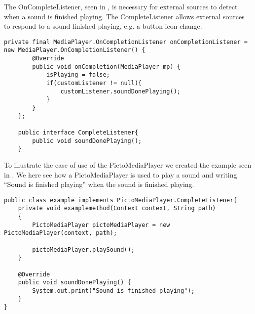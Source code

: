 The OnCompleteListener, seen in , is necessary for external sources to detect when a sound is finished playing. The CompleteListener allows external sources to respond to a sound finished playing, e.g. a button icon change.

\begin{lstlisting}[label=lst:completelistener, caption = {onCompleteListener method of PictoMediaPlayer}]
private final MediaPlayer.OnCompletionListener onCompletionListener = new MediaPlayer.OnCompletionListener() {
        @Override
        public void onCompletion(MediaPlayer mp) {
            isPlaying = false;
            if(customListener != null){
                customListener.soundDonePlaying();
            }
        }
    };

    public interface CompleteListener{
        public void soundDonePlaying();
    }
\end{lstlisting}

To illustrate the ease of use of the PictoMediaPlayer we created the example seen in . 
We here see how a PictoMediaPlayer is used to play a sound and writing ``Sound is finished playing'' when the sound is finished playing.

\begin{lstlisting}[label=lst:mediaplayerexample, caption={Example of PictoMediaPlayer}]
public class example implements PictoMediaPlayer.CompleteListener{
    private void examplemethod(Context context, String path)
    {
        PictoMediaPlayer pictoMediaPlayer = new PictoMediaPlayer(context, path);

        pictoMediaPlayer.playSound();
    }

    @Override
    public void soundDonePlaying() {
        System.out.print("Sound is finished playing");
    }
}
\end{lstlisting}






